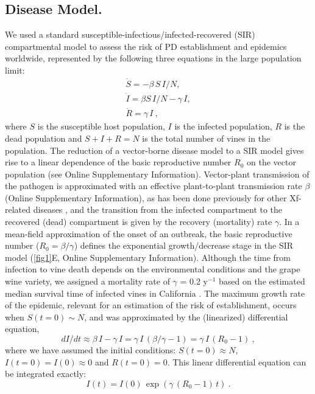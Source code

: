     \subsection{Disease Model.} We used a standard
    susceptible-infectious/infected-recovered (SIR) compartmental model to
    assess
    the risk of PD establishment and epidemics worldwide, represented by the
    following three equations in the large population limit:
    \begin{equation}
        \begin{array}{l}
            \dot{S}=-\beta \, S \, I/N ,         \\
            \dot{I}=\beta S\, I/N - \gamma\,  I, \\
            \dot{R}=\gamma \, I \ ,
        \end{array}
        \label{eq:SIRmodel}
    \end{equation}
    where $S$ is the susceptible host population, $I$ is the infected
    population, $R$ is the dead population and $S+I+R=N$ is the total number of
    vines in the population. The reduction of a vector-borne disease model to a
    SIR
    model gives rise to a linear dependence of the basic reproductive number
$R_0$
    on the vector population (see Online Supplementary Information).
    Vector-plant
    transmission
    of the pathogen is approximated with an effective plant-to-plant
    transmission
    rate $\beta$ (Online Supplementary Information), as has been done
    previously
    for
    other Xf-related diseases \cite{White2020}, and the transition from the
    infected compartment to the recovered (dead) compartment is given by the
    recovery (mortality) rate $\gamma$.  In a mean-field approximation of the
    onset
    of an outbreak, the basic reproductive number ($R_0=\beta/\gamma$) defines
    the
    exponential growth/decrease stage in the SIR model (\cref{fig1}E,
    Online Supplementary Information). Although the time from infection to vine
    death depends on
    the
    environmental conditions and the grape wine variety, we assigned a
    mortality
    rate of $\gamma$ = 0.2 y$^{-1}$  based on the estimated median survival
    time of
    infected vines in California \cite{Almeida2003}. The maximum growth rate of
    the
    epidemic, relevant for an estimation of the risk of establishment, occurs
    when
$S(t=0)\sim N$, and was approximated by the (linearized) differential equation,
    \begin{equation}
        dI/dt \approx \beta \, I-\gamma \, I = \gamma\,  I\, (\beta/\gamma -
        1)=\gamma \, I\, (R_0-1) \ ,
    \end{equation}
    where we have assumed the initial conditions:
$S(t= 0)\approx N$, $I(t = 0)= I(0) \approx0$ and $R(t = 0)=0$. This linear
    differential equation can be integrated exactly:
    \begin{equation}\label{eq: infect_proc}
        I(t)=I(0)\, \exp(\gamma\, (R_0-1)\, t) \ .
    \end{equation}


